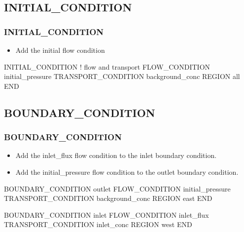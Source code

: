 \documentclass{beamer}
\newcommand\redcomment[1]{{{\color{red} #1}}}
\newcommand\bluecomment[1]{{{\color{blue} #1}}}
\newcommand\greencomment[1]{{{\color{green} #1}}}
\newcommand\magentacomment[1]{{{\color{magenta} #1}}}
\begin{document}
\subsection{INITIAL\_CONDITION}

\begin{frame}[fragile]\frametitle{INITIAL\_CONDITION}

\begin{itemize}
\item Add the \greencomment{initial} flow condition
\end{itemize}

\begin{semiverbatim}

INITIAL_CONDITION              \bluecomment{! flow and transport}
  \magentacomment{FLOW_CONDITION initial_pressure}
  TRANSPORT_CONDITION background_conc
  REGION all
END

\end{semiverbatim}

\end{frame}

\subsection{BOUNDARY\_CONDITION}

\begin{frame}[fragile]\frametitle{BOUNDARY\_CONDITION}

\begin{itemize}
\item Add the \greencomment{inlet\_flux} flow condition to the \redcomment{inlet} boundary condition.
\item Add the \greencomment{initial\_pressure} flow condition to the \redcomment{outlet} boundary condition.
\end{itemize}

\begin{semiverbatim}

BOUNDARY_CONDITION outlet
  \magentacomment{FLOW_CONDITION initial_pressure}
  TRANSPORT_CONDITION background_conc
  REGION east
END

BOUNDARY_CONDITION inlet
  \magentacomment{FLOW_CONDITION inlet_flux}
  TRANSPORT_CONDITION inlet_conc
  REGION west
END

\end{semiverbatim}

\end{frame}
\end{document}
